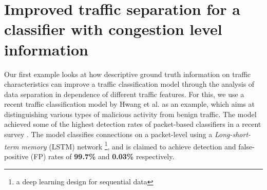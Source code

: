 \documentclass[conference]{IEEEtran}
\begin{document}






\section{Improved traffic separation for a classifier with congestion level information}\label{Sec:Improvedtrafficsep}


Our first example looks at how descriptive ground truth information on traffic characteristics can improve a traffic classification model through the analysis of data separation in dependence of different traffic features. For this, we use a recent traffic classification model by Hwang et al. \cite{hwang2019lstm} as an example, which aims at distinguishing various types of malicious activity from benign traffic. The model achieved some of the highest detection rates of packet-based classifiers in a recent survey \cite{tahaei2020rise}.
The model classifies connections on a packet-level using a \textit{Long-short-term memory} (LSTM) network \footnote{a deep learning design for sequential data}, and is claimed to achieve detection and false-positive (FP) rates of \textbf{99.7\%} and \textbf{0.03\%} respectively. 
\end{document}

